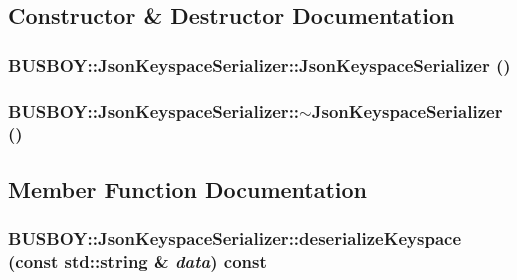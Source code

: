 \subsection{Constructor \& Destructor Documentation}
\hypertarget{classBUSBOY_1_1JsonKeyspaceSerializer_a241b1957f194b7d4e17febb5b7c56a42}{
\subsubsection[{JsonKeyspaceSerializer}]{\setlength{\rightskip}{0pt plus 5cm}BUSBOY::JsonKeyspaceSerializer::JsonKeyspaceSerializer ()}}
\label{classBUSBOY_1_1JsonKeyspaceSerializer_a241b1957f194b7d4e17febb5b7c56a42}
\hypertarget{classBUSBOY_1_1JsonKeyspaceSerializer_a62270f52f841bbee25f6366b61d7bbf8}{
\subsubsection[{$\sim$JsonKeyspaceSerializer}]{\setlength{\rightskip}{0pt plus 5cm}BUSBOY::JsonKeyspaceSerializer::$\sim$JsonKeyspaceSerializer ()}}
\label{classBUSBOY_1_1JsonKeyspaceSerializer_a62270f52f841bbee25f6366b61d7bbf8}


\subsection{Member Function Documentation}
\hypertarget{classBUSBOY_1_1JsonKeyspaceSerializer_a56484d5a6fe986dc5e1cb3abcd3e8d00}{
\subsubsection[{deserializeKeyspace}]{ BUSBOY::JsonKeyspaceSerializer::deserializeKeyspace (const std::string \& {\em data}) const}}
\label{classBUSBOY_1_1JsonKeyspaceSerializer_a56484d5a6fe986dc5e1cb3abcd3e8d00}


